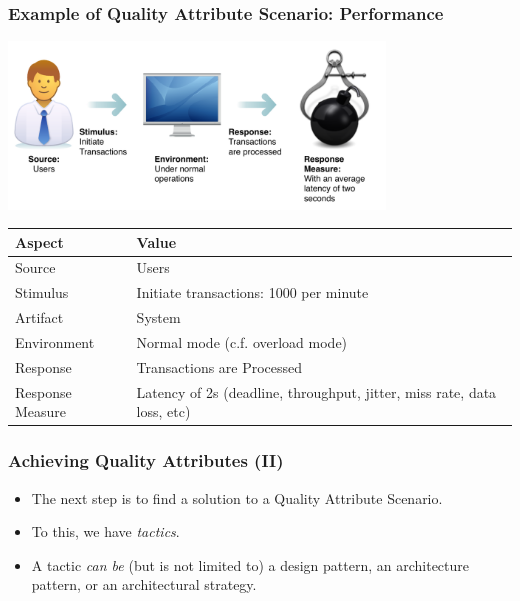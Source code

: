 \documentclass[10pt]{beamer}
\begin{document}
\begin{frame}[t]
\frametitle{Example of Quality Attribute Scenario: Performance}
\includegraphics[width=10cm]{IQAScenario.pdf}
\begin{scriptsize}
\begin{tabular}{ll}
Aspect & Value\\
\hline
Source & Users\\
Stimulus & Initiate transactions: 1000 per minute\\
Artifact & System\\
Environment & Normal mode (c.f. overload mode)\\
Response & Transactions are Processed\\
Response Measure & Latency of 2s (deadline, throughput, jitter, miss rate, data loss, etc)\\
\hline
\end{tabular}
\end{scriptsize}
\end{frame}

\begin{frame}[t]
\frametitle{Achieving Quality Attributes (II)}
\begin{itemize}
\item The next step is to find a solution to a Quality Attribute Scenario.
\item To this, we have \emph{tactics}.
\item A tactic \emph{can be} (but is not limited to) a design pattern, an architecture pattern, or an architectural strategy.
\end{itemize}
\end{frame}
\end{document}
